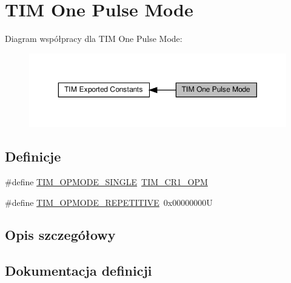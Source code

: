 \hypertarget{group___t_i_m___one___pulse___mode}{}\section{T\+IM One Pulse Mode}
\label{group___t_i_m___one___pulse___mode}
Diagram współpracy dla T\+IM One Pulse Mode\+:\nopagebreak
\begin{figure}[H]
\begin{center}
\leavevmode
\includegraphics[width=350pt]{group___t_i_m___one___pulse___mode}
\end{center}
\end{figure}
\subsection*{Definicje}
\begin{DoxyCompactItemize}
\item 
\#define \hyperlink{group___t_i_m___one___pulse___mode_gab0447b341024e86145c7ce0dc2931fc6}{T\+I\+M\+\_\+\+O\+P\+M\+O\+D\+E\+\_\+\+S\+I\+N\+G\+LE}~\hyperlink{group___peripheral___registers___bits___definition_ga6d3d1488296350af6d36fbbf71905d29}{T\+I\+M\+\_\+\+C\+R1\+\_\+\+O\+PM}
\item 
\#define \hyperlink{group___t_i_m___one___pulse___mode_ga14a7b6f95769c5b430f65189d9c7cfa3}{T\+I\+M\+\_\+\+O\+P\+M\+O\+D\+E\+\_\+\+R\+E\+P\+E\+T\+I\+T\+I\+VE}~0x00000000U
\end{DoxyCompactItemize}


\subsection{Opis szczegółowy}


\subsection{Dokumentacja definicji}
\mbox{\label{group___t_i_m___one___pulse___mode_ga14a7b6f95769c5b430f65189d9c7cfa3}} 
